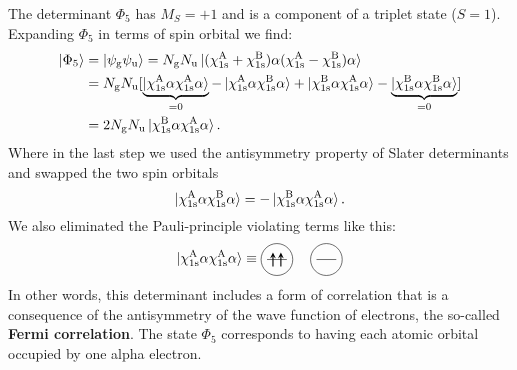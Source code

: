 \documentclass[../Main/chem532-notes.tex]{subfiles}
\begin{document}
The determinant $\Phi_5$ has $M_S = +1$ and is a component of a triplet state ($S = 1$).
Expanding $\Phi_5$ in terms of spin orbital we find:
\begin{equation}
\begin{split}
\ket{\Phi_5} &= \ket{\psi_{\mathrm{g}} \psi_{\mathrm{u}}} = N_{\mathrm{g}} N_{\mathrm{u}} \ket{ (\chi_{1\rm s}^{\rm A} + \chi_{1\rm s}^{\rm B}) \alpha  (\chi_{1\rm s}^{\rm A} - \chi_{1\rm s}^{\rm B}) \alpha} \\
&= N_{\mathrm{g}} N_{\mathrm{u}}  [
\underbrace{\ket{\chi_{1\rm s}^{\rm A}\alpha \chi_{1\rm s}^{\rm A}\alpha}}_{= 0}
- \ket{\chi_{1\rm s}^{\rm A}\alpha \chi_{1\rm s}^{\rm B}\alpha}
+ \ket{\chi_{1\rm s}^{\rm B}\alpha \chi_{1\rm s}^{\rm A}\alpha} 
- \underbrace{\ket{\chi_{1\rm s}^{\rm B}\alpha \chi_{1\rm s}^{\rm B}\alpha}}_{= 0}] \\
&= 2 N_{\mathrm{g}} N_{\mathrm{u}}  \ket{\chi_{1\rm s}^{\rm B}\alpha \chi_{1\rm s}^{\rm A}\alpha} .
\end{split}
\end{equation}
Where in the last step we used the antisymmetry property of Slater determinants and swapped the two spin orbitals
\begin{equation}
\ket{\chi_{1\rm s}^{\rm A}\alpha \chi_{1\rm s}^{\rm B}\alpha} = -\ket{\chi_{1\rm s}^{\rm B}\alpha \chi_{1\rm s}^{\rm A}\alpha}.
\end{equation}
We also eliminated the Pauli-principle violating terms like this:
\begin{equation}
 \ket{\chi_{1\rm s}^{\rm A}\alpha \chi_{1\rm s}^{\rm A}\alpha} \equiv 
 \begin{tikzpicture}[baseline={([yshift=-.5ex]current bounding box.center)},vertex/.style={anchor=base, minimum size=18pt, inner sep=2pt}]
    \draw (0.25,0.5) circle (0.4);
    \draw (0,0.5) -- (0.5,0.5);
    \draw[thick,->,>=stealth] (0.15,0.325) -- (0.15,0.675);
    \draw[thick,->,>=stealth] (0.35,0.325) -- (0.35,0.675);    
    \draw (1.5,0.5) circle (0.4);
    \draw (1.25,0.5) -- (1.75,0.5);
  \end{tikzpicture}
\end{equation}
In other words, this determinant includes a form of correlation that is a consequence of the antisymmetry of the wave function of electrons, the so-called \textbf{Fermi correlation}.
The state $\Phi_5$ corresponds to having each atomic orbital occupied by one alpha electron.
\end{document}
